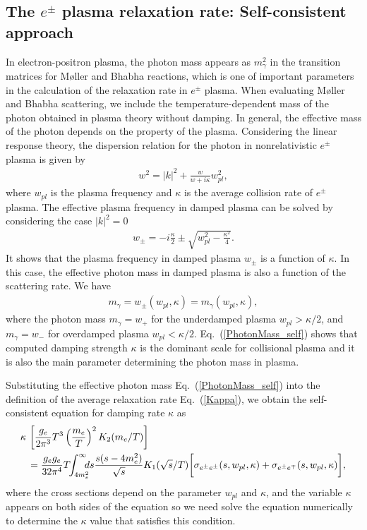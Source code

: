 \subsection{The $e^\pm$ plasma relaxation rate: Self-consistent approach}
In electron-positron plasma, the photon mass appears as $m_\gamma^2$ in the transition matrices for M{\o}ller and Bhabha reactions, which is one of important parameters in the calculation of the relaxation rate in $e^\pm$ plasma. When evaluating M{\o}ller and Bhabha scattering, we include the temperature-dependent mass of the photon obtained in plasma theory without damping. In general, the effective mass of the photon depends on the property of the plasma. Considering the linear response theory, the dispersion relation for the photon in nonrelativistic $e^\pm$ plasma is given by~\cite{Formanek:2021blc}
\begin{align}\label{dispersion_damping}
w^2=|k|^2+\frac{w}{w+i\kappa}w_{pl}^2,
\end{align}
where $w_{pl}$ is the plasma frequency and $\kappa$ is the average collision rate of $e^\pm$ plasma. The effective plasma frequency in damped plasma can be solved by considering the case $|k|^2=0$~\cite{Formanek:2021blc}
\begin{align}\label{plasmafrequency_damped}
w_{\pm}=-i\frac{\kappa}{2}\pm\sqrt{w^2_{pl}-\frac{\kappa^2}{4}}.
\end{align}
It shows that the plasma frequency in damped plasma $w_\pm$ is a function of $\kappa.$  In this case, the effective photon mass in damped plasma is also a function of the scattering rate. We have
\begin{align}\label{PhotonMass_self}
m_\gamma=w_\pm(w_{pl},\kappa)=m_\gamma(w_{pl},\kappa),
\end{align}
where the photon mass $m_\gamma=w_+$ for the underdamped plasma $w_{pl}>\kappa/2$, and $m_\gamma=w_-$ for overdamped plasma $w_{pl}<\kappa/2$. Eq.~(\ref{PhotonMass_self}) shows that computed damping strength $\kappa$ is the dominant scale for collisional plasma and it is also the main parameter determining the photon mass in plasma. 

Substituting the effective photon mass Eq.~(\ref{PhotonMass_self}) into the definition of the average relaxation rate Eq.~(\ref{Kappa}), we obtain the self-consistent equation for damping rate $\kappa$ as 
\begin{align}\label{RealaxtionSelf}
\kappa\,&\left[\frac{g_e}{2\pi^3}T^3\left(\frac{m_e}{T}\right)^2K_2(m_e/T)\right]\notag\\&=\frac{g_eg_e}{32\pi^4}T\!\!\int_{4m_e^2}^\infty\!\!\!\!ds\frac{s(s-4m^2_e)}{\sqrt{s}}K_1(\sqrt{s}/T)
\bigg[\sigma_{e^\pm e^\pm}(s,w_{pl},\kappa)+\sigma_{e^\pm e^\mp}(s,w_{pl},\kappa)\bigg],
\end{align}
where the cross sections depend on the parameter $w_{pl}$ and $\kappa$, and the variable $\kappa$ appears on both sides of the equation so we need solve the equation numerically to determine the $\kappa$ value that satisfies this condition.

